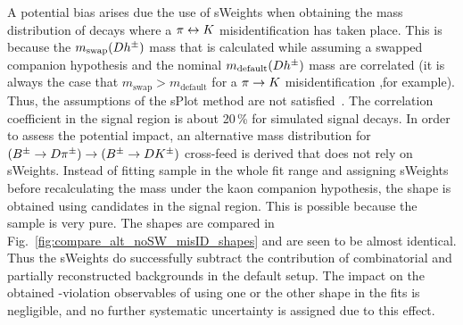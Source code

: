 
A potential bias arises due the use of sWeights when obtaining the mass distribution of decays where a $\pi\leftrightarrow {\ensuremath{K}}$ misidentification has taken place. This is because the $m_\mathrm{swap}({D} h^\pm)$ mass that is calculated while assuming a swapped companion hypothesis and the nominal $m_\mathrm{default}({D} h^\pm)$ mass are correlated (it is always the case that $m_\mathrm{swap} > m_\mathrm{default}$ for a $\pi\rightarrow{\ensuremath{K}}$ misidentification ,for example). Thus, the assumptions of the sPlot method are not satisfied~\cite{Pivk:2004ty}. The correlation coefficient in the signal region is about 20\,\% for simulated signal decays. In order to assess the potential impact, an alternative mass distribution for $({{{B}^\pm}\rightarrow{\ensuremath{D}}{\ensuremath{{\pi}^\pm}}})\rightarrow({{{B}^\pm}\rightarrow{\ensuremath{D}}{\ensuremath{{K}^\pm}}})$ cross-feed is derived that does not rely on sWeights. Instead of fitting \BtoDpi sample in the whole fit range and assigning sWeights before recalculating the \B mass under the kaon companion hypothesis, the shape is obtained using \BtoDpi candidates in the signal region. This is possible because the \BtoDpi sample is very pure. The shapes are compared in Fig.~\ref{fig:compare_alt_noSW_misID_shapes} and are seen to be almost identical. Thus the sWeights do successfully subtract the contribution of combinatorial and partially reconstructed backgrounds in the default setup. The impact on the obtained \CP-violation observables of using one or the other shape in the fits is negligible, and no further systematic uncertainty is assigned due to this effect. 

